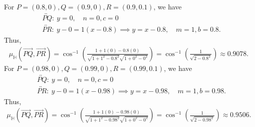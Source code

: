 \documentclass{report}
\begin{document}
    \bigbreak \noindent 
    For $P=(0.8,0), Q=(0.9,0), R=(0.9,0.1)$, we have
    \begin{align*}
        &\overleftrightarrow{PQ}:\ y=0, \quad n = 0, c = 0\\
        &\overleftrightarrow{PR}:\ y - 0 = 1(x-0.8) \implies y = x-0.8, \quad m=1, b=0.8
    .\end{align*}
    Thus,
    \begin{align*}
        \mu_{\mathbb{H}}(\overrightarrow{PQ}, \overrightarrow{PR}) = \cos^{-1}{\left(\frac{1+1(0)-0.8(0)}{\sqrt{1+1^{2}-0.8^{2}}\sqrt{1+0^{2}-0^{2}}}\right)} = \cos^{-1}{\left(\frac{1}{\sqrt{2-0.8^{2}}}\right)} \approx 0.9078
    .\end{align*}
    For $P=(0.98,0), Q=(0.99,0), R=(0.99,0.1)$, we have
    \begin{align*}
        &\overleftrightarrow{PQ}:\ y=0, \quad n = 0, c = 0\\
        &\overleftrightarrow{PR}:\ y - 0 = 1(x-0.98) \implies y = x-0.98, \quad m=1, b=0.98
    .\end{align*}
    Thus,
    \begin{align*}
            \mu_{\mathbb{H}}(\overrightarrow{PQ}, \overrightarrow{PR}) = \cos^{-1}{\left(\frac{1+1(0)-0.98(0)}{\sqrt{1+1^{2}-0.98^{2}}\sqrt{1+0^{2}-0^{2}}}\right)} = \cos^{-1}{\left(\frac{1}{\sqrt{2-0.98^{2}}}\right)} \approx 0.9506
    .\end{align*}

    
    
\end{document}
